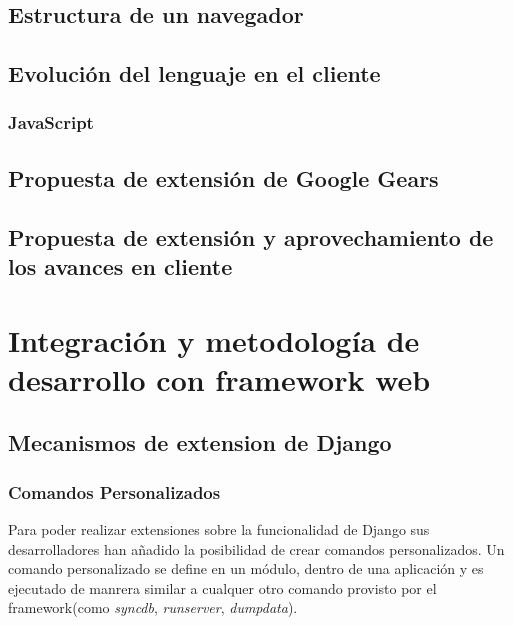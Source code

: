 \documentclass[a4paper]{report}
\begin{document}
\section{Estructura de un navegador}

\section{Evolución del lenguaje en el cliente}
\subsection{JavaScript}

\section{Propuesta de extensión de Google Gears}
\section{Propuesta de extensión y aprovechamiento de los avances en cliente}




\chapter{Integración y metodología de desarrollo con framework web}
\section{Mecanismos de extension de Django}

\subsection{Comandos Personalizados}



Para poder realizar extensiones sobre la funcionalidad de Django sus
desarrolladores han añadido la posibilidad de crear comandos
personalizados. Un comando personalizado se define en un módulo, dentro
de una aplicación y es ejecutado de manrera similar a cualquer 
otro comando provisto por el framework(como 
\emph{syncdb}, \emph{runserver}, \emph{dumpdata}).
\end{document}

